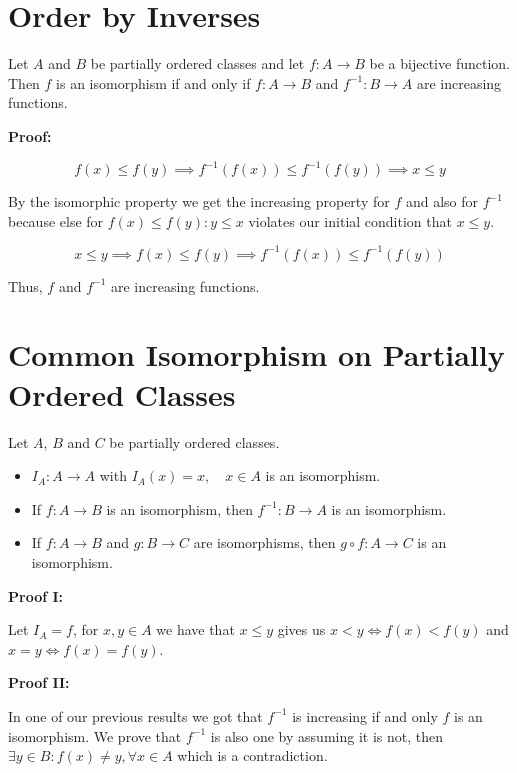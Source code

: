 \QED

\section{Order by Inverses}

Let \(A\) and \(B\) be partially ordered classes and let \(f: A \to B\) be a bijective function. Then \(f\) is
an isomorphism if and only if \(f: A \to B\) and \(f^{-1}: B \to A\) are increasing functions.

\textbf{Proof:}

\[
	f(x) \le f(y) \implies f^{-1}(f(x)) \le f^{-1}(f(y)) \implies x \le y
\]

By the isomorphic property we get the increasing property for \(f\) and also for \(f^{-1}\) because else for \(f(x) \le f(y): y \le x\) violates our initial condition that \(x \le y\).

\[
	x \le y \implies f(x) \le f(y) \implies f^{-1}(f(x)) \le f^{-1}(f(y))
\]

Thus, \(f\) and \(f^{-1}\) are increasing functions.

\QED

\section{Common Isomorphism on Partially Ordered Classes}

Let \(A\), \(B\) and \(C\) be partially ordered classes.

\begin{itemize}

	\item \(I_A: A \to A\) with \(I_A(x) = x, \quad x \in A\) is an isomorphism.
	\item If \(f: A \to B\) is an isomorphism, then \(f^{-1}: B \to A\) is an isomorphism.
	\item If \(f: A \to B\) and \(g: B \to C\) are isomorphisms, then \(g \circ f: A \to C\) is an isomorphism.

\end{itemize}

\textbf{Proof I:}

Let \(I_A = f\), for \(x, y \in A\) we have that \(x \le y\) gives us \(x < y \iff f(x) < f(y)\) and \(x = y \iff f(x) = f(y)\).

\QED

\textbf{Proof II:}

In one of our previous results we got that \(f^{-1}\) is increasing if and only \(f\) is an isomorphism. We prove that \(f^{-1}\) is also one by
assuming it is not, then \(\exists y \in B: f(x) \ne y, \forall x \in A\) which is a contradiction.

